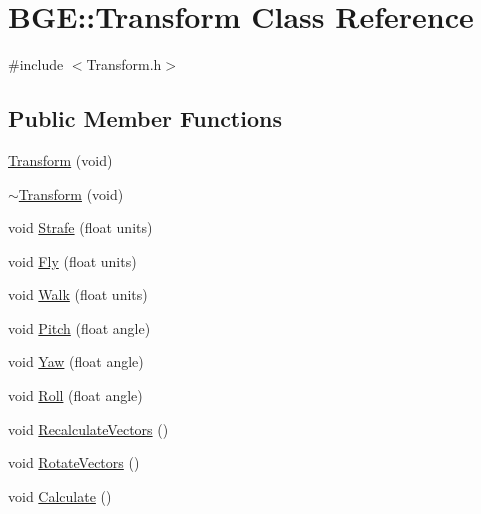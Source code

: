 \hypertarget{class_b_g_e_1_1_transform}{\section{B\-G\-E\-:\-:Transform Class Reference}
\label{class_b_g_e_1_1_transform}
}


{\ttfamily \#include $<$Transform.\-h$>$}

\subsection*{Public Member Functions}
\begin{DoxyCompactItemize}
\item 
\hyperlink{class_b_g_e_1_1_transform_a2bd04f8338d86c793d3e2dea51a097d0}{Transform} (void)
\item 
\hyperlink{class_b_g_e_1_1_transform_a80286cc4143f89cb5f8bc8ec3f1dcb74}{$\sim$\-Transform} (void)
\item 
void \hyperlink{class_b_g_e_1_1_transform_a0f196f5a284360e93d89a6c3682d35c3}{Strafe} (float units)
\item 
void \hyperlink{class_b_g_e_1_1_transform_aaa452fdfbdb3969155b6f1bd47a927ad}{Fly} (float units)
\item 
void \hyperlink{class_b_g_e_1_1_transform_a4896ce57bb9a095e4c0c7d1e516c9794}{Walk} (float units)
\item 
void \hyperlink{class_b_g_e_1_1_transform_a40362762be81682283de0a0333d4a04f}{Pitch} (float angle)
\item 
void \hyperlink{class_b_g_e_1_1_transform_a392eb09dfdeae0f8f0b67a6477ac28f5}{Yaw} (float angle)
\item 
void \hyperlink{class_b_g_e_1_1_transform_a77b194efd21538b95470bf9a84de5834}{Roll} (float angle)
\item 
void \hyperlink{class_b_g_e_1_1_transform_ae0f8cd2f1ddaa196ef67b43d01725086}{Recalculate\-Vectors} ()
\item 
void \hyperlink{class_b_g_e_1_1_transform_a42bc887033106184fcaa282a8a88950c}{Rotate\-Vectors} ()
\item 
void \hyperlink{class_b_g_e_1_1_transform_a8f697d8c4ea4f6c4e24a79354bcc7070}{Calculate} ()
\end{DoxyCompactItemize}
